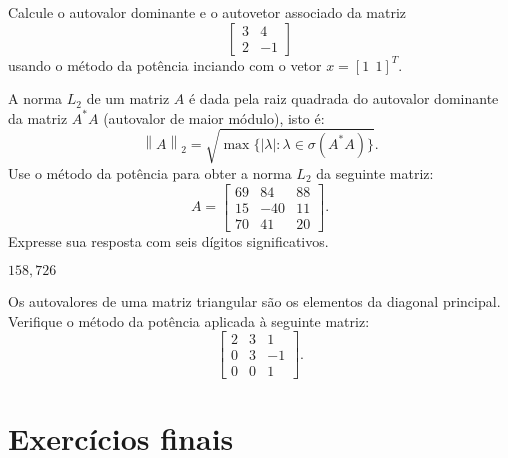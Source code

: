 \begin{exer}Calcule o autovalor dominante e o autovetor associado da matriz
\begin{equation}
\left[\begin{array}{cc}
3&4\\2&-1
\end{array}\right]
\end{equation}
usando o método da potência inciando com o vetor $x=[1~~  1]^T$.
\end{exer}
\begin{resp}
  \construirResp
\end{resp}

\begin{exer} A norma $L_2$ de um matriz $A$  é dada pela raiz quadrada do autovalor dominante da matriz $A^*A$ (autovalor de maior módulo), isto é: \begin{equation} \left\|A\right\|_2=\sqrt{\max\{|\lambda|: \lambda\in\sigma(A^*A)\}}. \end{equation}
Use o método da potência para obter a norma $L_2$ da seguinte matriz:
\begin{equation}A=\left[\begin{array}{ccc}

    69&    84&    88\\
    15&  - 40&    11\\
    70&    41&    20
\end{array}\right].
\end{equation}
Expresse sua resposta com seis dígitos significativos.
\end{exer}
\begin{resp}
$158,726$
\end{resp}


\begin{exer} Os autovalores de uma matriz triangular são os elementos da diagonal principal. Verifique o método da potência aplicada à seguinte matriz:
\begin{equation}
\left[\begin{array}{ccc}
2&3&1\\
0&3&-1\\
0&0&1
\end{array}\right].
\end{equation}
\end{exer}
\begin{resp}
  \construirResp
\end{resp}

\section{Exercícios finais}

